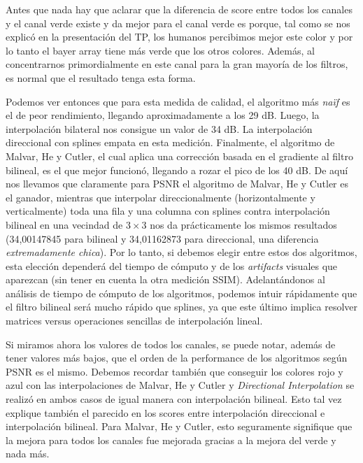 \begin{itemize}
Antes que nada hay que aclarar que la diferencia de score entre todos los canales y el canal verde existe y da mejor para el canal verde es porque, tal como se nos explicó en la presentación del TP, los humanos percibimos mejor este color y por lo tanto el bayer array tiene más verde que los otros colores. Además, al concentrarnos primordialmente en este canal para la gran mayoría de los filtros, es normal que el resultado tenga esta forma.

Podemos ver entonces que para esta medida de calidad, el algoritmo más \textit{naïf} es el de peor rendimiento, llegando aproximadamente a los 29 dB. Luego, la interpolación bilateral nos consigue un valor de 34 dB. La interpolación direccional con splines empata en esta medición. Finalmente, el algoritmo de Malvar, He y Cutler, el cual aplica una corrección basada en el gradiente al filtro bilineal, es el que mejor funcionó, llegando a rozar el pico de los 40 dB. De aquí nos llevamos que claramente para PSNR el algoritmo de Malvar, He y Cutler es el ganador, mientras que interpolar direccionalmente (horizontalmente y verticalmente) toda una fila y una columna con splines contra interpolación bilineal en una vecindad de $3 \times 3$  nos da prácticamente los mismos resultados (34,00147845 para bilineal y 34,01162873 para direccional, una diferencia \textit{extremadamente chica}). Por lo tanto, si debemos elegir entre estos dos algoritmos, esta elección dependerá del tiempo de cómputo y de los \textit{artifacts} visuales que aparezcan (sin tener en cuenta la otra medición SSIM). Adelantándonos al análisis de tiempo de cómputo de los algoritmos, podemos intuir rápidamente que el filtro bilineal será mucho rápido que splines, ya que este último implica resolver matrices versus operaciones sencillas de interpolación lineal.

Si miramos ahora los valores de todos los canales, se puede notar, además de tener valores más bajos, que el orden de la performance de los algoritmos según PSNR es el mismo. Debemos recordar también que conseguir los colores rojo y azul con las interpolaciones de Malvar, He y Cutler y \textit{Directional Interpolation} se realizó en ambos casos de igual manera con interpolación bilineal. Esto tal vez explique también el parecido en los scores entre interpolación direccional e interpolación bilineal. Para Malvar, He y Cutler, esto seguramente signifique que la mejora para todos los canales fue mejorada gracias a la mejora del verde y nada más.

\vspace{\baselineskip}


\end{itemize}
